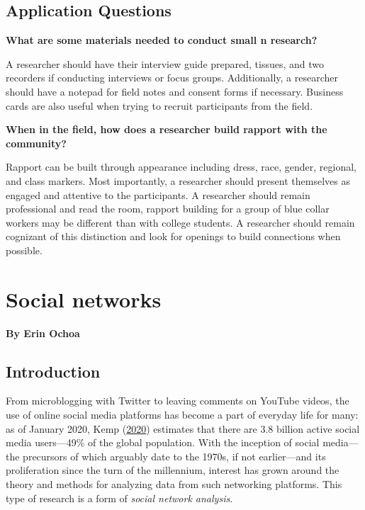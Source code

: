 \documentclass{book}
\newenvironment{shaded*}{
    \begin{center}
    \begin{tabular}{|p{0.9\textwidth}|}
    \hline\\
    }
    { 
    \\\\\hline
    \end{tabular} 
    \end{center}
}
\begin{document}
\hypertarget{application-questions-7}{%
\section{Application Questions}\label{application-questions-7}}

\textbf{What are some materials needed to conduct small n research?}

\begin{shaded*}

A researcher should have their interview guide prepared, tissues, and two
recorders if conducting interviews or focus groups. Additionally, a researcher
should have a notepad for field notes and consent forms if necessary. Business
cards are also useful when trying to recruit participants from the field.

\end{shaded*}

\textbf{When in the field, how does a researcher build rapport with the community?}

\begin{shaded*}

Rapport can be built through appearance including dress, race, gender,
regional, and class markers. Most importantly, a researcher should present
themselves as engaged and attentive to the participants. A researcher should
remain professional and read the room, rapport building for a group of blue
collar workers may be different than with college students. A researcher
should remain cognizant of this distinction and look for openings to build
connections when possible.

\end{shaded*}

\hypertarget{social-networks}{%
\chapter{Social networks}\label{social-networks}}

\textbf{By Erin Ochoa}

\hypertarget{introduction-8}{%
\section{Introduction}\label{introduction-8}}

From microblogging with Twitter to leaving comments on YouTube videos, the use
of online social media platforms has become a part of everyday life for many:
as of January 2020, Kemp (\protect\hyperlink{ref-Kemp2020}{2020}) estimates
that there are 3.8 billion active social media users---49\% of the global
population. With the inception of social media---the precursors of which
arguably date to the 1970s, if not earlier---and its proliferation since the
turn of the millennium, interest has grown around the theory and methods for
analyzing data from such networking platforms. This type of research is a form
of \emph{social network analysis}.
\end{document}
